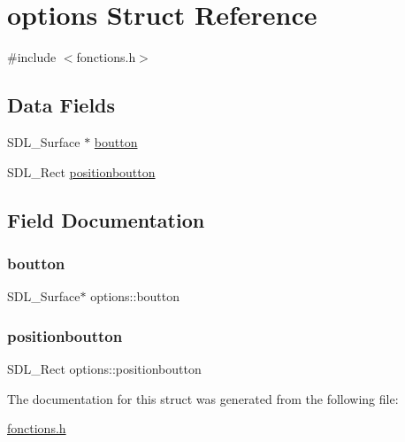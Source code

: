 \hypertarget{structoptions}{}\section{options Struct Reference}
\label{structoptions}


{\ttfamily \#include $<$fonctions.\+h$>$}

\subsection*{Data Fields}
\begin{DoxyCompactItemize}
\item 
S\+D\+L\+\_\+\+Surface $\ast$ \hyperlink{structoptions_a712af86841757c3f520dc5fe50edc5cb}{boutton}
\item 
S\+D\+L\+\_\+\+Rect \hyperlink{structoptions_af6da4211a6cb028c103f9471a374bb6e}{positionboutton}
\end{DoxyCompactItemize}


\subsection{Field Documentation}
\mbox{\label{structoptions_a712af86841757c3f520dc5fe50edc5cb}} 
\subsubsection{\texorpdfstring{boutton}{boutton}}
{\footnotesize\ttfamily S\+D\+L\+\_\+\+Surface$\ast$ options\+::boutton}

\mbox{\label{structoptions_af6da4211a6cb028c103f9471a374bb6e}} 
\subsubsection{\texorpdfstring{positionboutton}{positionboutton}}
{\footnotesize\ttfamily S\+D\+L\+\_\+\+Rect options\+::positionboutton}



The documentation for this struct was generated from the following file\+:\begin{DoxyCompactItemize}
\item 
\hyperlink{fonctions_8h}{fonctions.\+h}\end{DoxyCompactItemize}
